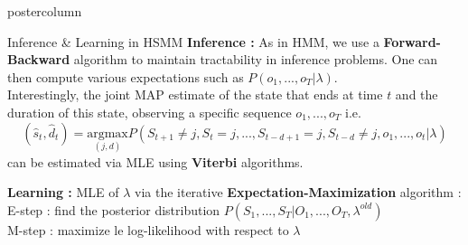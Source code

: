 \documentclass[final,hyperref={pdfpagelabels=false}]{beamer}
\newlength{\columnheight}
\begin{document}
\begin{frame}
\begin{columns}
    \begin{column}{.49\textwidth}
      \begin{beamercolorbox}[center,wd=\textwidth]{postercolumn}
        \begin{minipage}[T]{.95\textwidth} %
          \parbox[t][\columnheight]{\textwidth}{ %
            \begin{block}{Inference \& Learning in HSMM}
                \textbf{Inference :}
                \vskip0.5cm
                As in HMM, we use a \textbf{Forward-Backward} algorithm to maintain tractability in inference problems.
                One can then compute various expectations such as $P(o_1, ..., o_T | \lambda)$.\\
                Interestingly, the joint MAP estimate of the state that ends at time $t$ and the duration of this state,
                observing a specific sequence $o_1, ..., o_T$ i.e.
                {\small $$(\hat s_t, \hat d_t) = \underset{(j,d)}{\mathrm{arg max}} P(S_{t+1} \neq j, S_t = j, ..., S_{t-d+1} = j, S_{t-d} \neq j, o_1, ..., o_t | \lambda)$$}
                can be estimated via MLE using \textbf{Viterbi} algorithms.

                \vskip1cm
                \textbf{Learning :}
                \vskip0.5cm
                MLE of $\lambda$ via the iterative \textbf{Expectation-Maximization} algorithm :\\
                E-step : find the posterior distribution {\small $P(S_1, ..., S_T | O_1, ..., O_T, \lambda^{old})$}\\
                M-step : maximize le log-likelihood with respect to $\lambda$
            \end{block}

}
\end{minipage}
\end{beamercolorbox}
\end{column}
\end{columns}
\end{frame}
\end{document}
